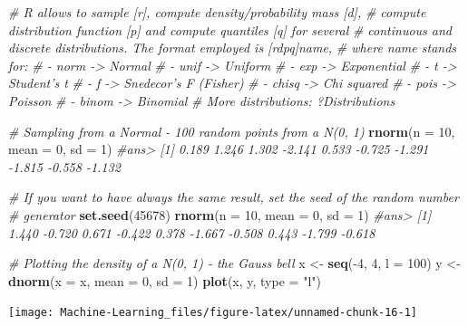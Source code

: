 \documentclass[]{book}
\newenvironment{Shaded}{\begin{snugshade}}{\end{snugshade}}
\newcommand{\KeywordTok}[1]{\textcolor[rgb]{0.13,0.29,0.53}{\textbf{{#1}}}}
\newcommand{\DataTypeTok}[1]{\textcolor[rgb]{0.13,0.29,0.53}{{#1}}}
\newcommand{\DecValTok}[1]{\textcolor[rgb]{0.00,0.00,0.81}{{#1}}}
\newcommand{\StringTok}[1]{\textcolor[rgb]{0.31,0.60,0.02}{{#1}}}
\newcommand{\CommentTok}[1]{\textcolor[rgb]{0.56,0.35,0.01}{\textit{{#1}}}}
\newcommand{\NormalTok}[1]{{#1}}
\begin{document}
\begin{Shaded}
\begin{Highlighting}[]
\CommentTok{# R allows to sample [r], compute density/probability mass [d],}
\CommentTok{# compute distribution function [p] and compute quantiles [q] for several}
\CommentTok{# continuous and discrete distributions. The format employed is [rdpq]name,}
\CommentTok{# where name stands for:}
\CommentTok{# - norm -> Normal}
\CommentTok{# - unif -> Uniform}
\CommentTok{# - exp -> Exponential}
\CommentTok{# - t -> Student's t}
\CommentTok{# - f -> Snedecor's F (Fisher)}
\CommentTok{# - chisq -> Chi squared}
\CommentTok{# - pois -> Poisson}
\CommentTok{# - binom -> Binomial}
\CommentTok{# More distributions: ?Distributions}


\CommentTok{# Sampling from a Normal - 100 random points from a N(0, 1)}
\KeywordTok{rnorm}\NormalTok{(}\DataTypeTok{n =} \DecValTok{10}\NormalTok{, }\DataTypeTok{mean =} \DecValTok{0}\NormalTok{, }\DataTypeTok{sd =} \DecValTok{1}\NormalTok{)}
\CommentTok{#ans>  [1]  0.189  1.246  1.302 -2.141  0.533 -0.725 -1.291 -1.815 -0.558 -1.132}

\CommentTok{# If you want to have always the same result, set the seed of the random number}
\CommentTok{# generator}
\KeywordTok{set.seed}\NormalTok{(}\DecValTok{45678}\NormalTok{)}
\KeywordTok{rnorm}\NormalTok{(}\DataTypeTok{n =} \DecValTok{10}\NormalTok{, }\DataTypeTok{mean =} \DecValTok{0}\NormalTok{, }\DataTypeTok{sd =} \DecValTok{1}\NormalTok{)}
\CommentTok{#ans>  [1]  1.440 -0.720  0.671 -0.422  0.378 -1.667 -0.508  0.443 -1.799 -0.618}

\CommentTok{# Plotting the density of a N(0, 1) - the Gauss bell}
\NormalTok{x <-}\StringTok{ }\KeywordTok{seq}\NormalTok{(-}\DecValTok{4}\NormalTok{, }\DecValTok{4}\NormalTok{, }\DataTypeTok{l =} \DecValTok{100}\NormalTok{)}
\NormalTok{y <-}\StringTok{ }\KeywordTok{dnorm}\NormalTok{(}\DataTypeTok{x =} \NormalTok{x, }\DataTypeTok{mean =} \DecValTok{0}\NormalTok{, }\DataTypeTok{sd =} \DecValTok{1}\NormalTok{)}
\KeywordTok{plot}\NormalTok{(x, y, }\DataTypeTok{type =} \StringTok{"l"}\NormalTok{)}
\end{Highlighting}
\end{Shaded}

\begin{center}\texttt{[image: Machine-Learning\_files/figure-latex/unnamed-chunk-16-1]} \end{center}
\end{document}
